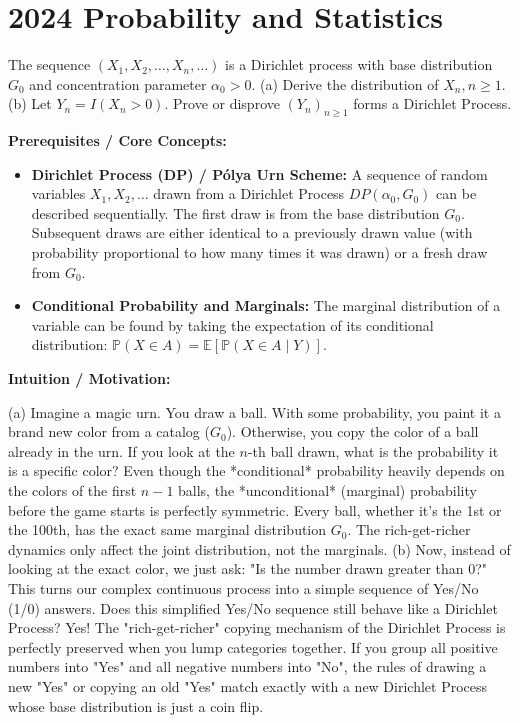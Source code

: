 \section{2024 Probability and Statistics}

\begin{exercise}\label{probability:2024:1}
The sequence $(X_1, X_2, \ldots, X_n, \ldots)$ is a Dirichlet process with base distribution $G_0$ and concentration parameter $\alpha_0 > 0$.
(a) Derive the distribution of $X_n, n \geq 1$.
(b) Let $Y_n = I(X_n > 0)$. Prove or disprove $(Y_n)_{n \geq 1}$ forms a Dirichlet Process.
\end{exercise}

\begin{solution}
\textbf{Prerequisites / Core Concepts:}
\begin{itemize}
    \item \textbf{Dirichlet Process (DP) / Pólya Urn Scheme:} A sequence of random variables $X_1, X_2, \dots$ drawn from a Dirichlet Process $DP(\alpha_0, G_0)$ can be described sequentially. The first draw is from the base distribution $G_0$. Subsequent draws are either identical to a previously drawn value (with probability proportional to how many times it was drawn) or a fresh draw from $G_0$.
    \item \textbf{Conditional Probability and Marginals:} The marginal distribution of a variable can be found by taking the expectation of its conditional distribution: $\mathbb{P}(X \in A) = \mathbb{E}[\mathbb{P}(X \in A \mid Y)]$.
\end{itemize}

\textbf{Intuition / Motivation:}

(a) Imagine a magic urn. You draw a ball. With some probability, you paint it a brand new color from a catalog ($G_0$). Otherwise, you copy the color of a ball already in the urn.
If you look at the $n$-th ball drawn, what is the probability it is a specific color? Even though the *conditional* probability heavily depends on the colors of the first $n-1$ balls, the *unconditional* (marginal) probability before the game starts is perfectly symmetric. Every ball, whether it's the 1st or the 100th, has the exact same marginal distribution $G_0$. The rich-get-richer dynamics only affect the joint distribution, not the marginals.
(b) Now, instead of looking at the exact color, we just ask: "Is the number drawn greater than 0?" This turns our complex continuous process into a simple sequence of Yes/No (1/0) answers.
Does this simplified Yes/No sequence still behave like a Dirichlet Process? Yes! The "rich-get-richer" copying mechanism of the Dirichlet Process is perfectly preserved when you lump categories together. If you group all positive numbers into "Yes" and all negative numbers into "No", the rules of drawing a new "Yes" or copying an old "Yes" match exactly with a new Dirichlet Process whose base distribution is just a coin flip.


\end{solution}

